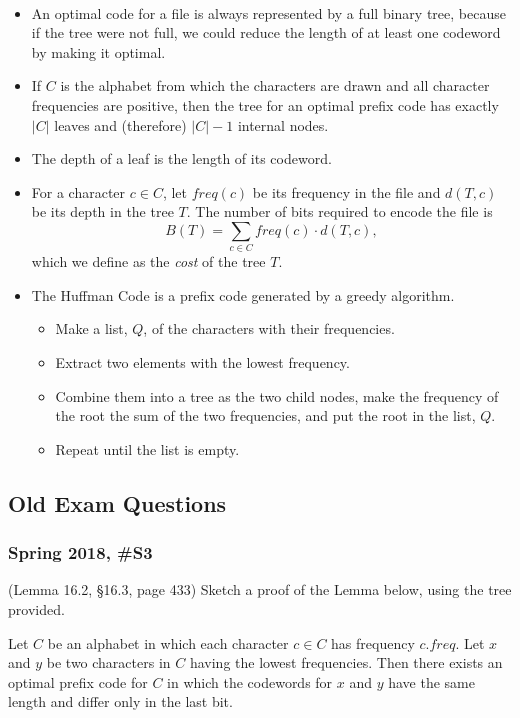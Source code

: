 \

\begin{itemize}	
	\item An optimal code for a file is always represented by a full binary tree, because if the tree were not full, we could reduce the length of at least one codeword by making it optimal.  
	\item If $C$ is the alphabet from which the characters are drawn and all character frequencies are positive, then the tree for an optimal prefix code has exactly $|C|$ leaves and (therefore) $|C|-1$ internal nodes.  
	\item The depth of a leaf is the length of its codeword.  
	\item For a character $c \in C$, let $freq(c)$ be its frequency in the file and $d(T,c)$ be its depth in the tree $T$.  The number of bits required to encode the file is
	$$B(T) = \sum_{c \in C} freq(c) \cdot d(T,c),$$
	which we define as the {\it cost} of the tree $T$.  
		
	\item The Huffman Code is a prefix code generated by a greedy algorithm.  
	
	\begin{itemize}
		\item Make a list, $Q$, of the characters with their frequencies.  
		\item Extract two elements with the lowest frequency.  
		\item Combine them into a tree as the two child nodes, make the frequency of the root the sum of the two frequencies, and put the root in the list, $Q$.  
		\item Repeat until the list is empty.  
	\end{itemize}
	
\end{itemize}


\subsection{Old Exam Questions}

\subsubsection{Spring 2018, \#S3}
(Lemma 16.2, \S 16.3, page 433) Sketch a proof of the Lemma below, using the tree provided.  
	
	Let $C$ be an alphabet in which each character $c \in C$ has frequency $c.freq$.  Let $x$ and $y$ be two characters in $C$ having the lowest frequencies.  Then there exists an optimal prefix code for $C$ in which the codewords for $x$ and $y$ have the same length and differ only in the last bit. 
	
